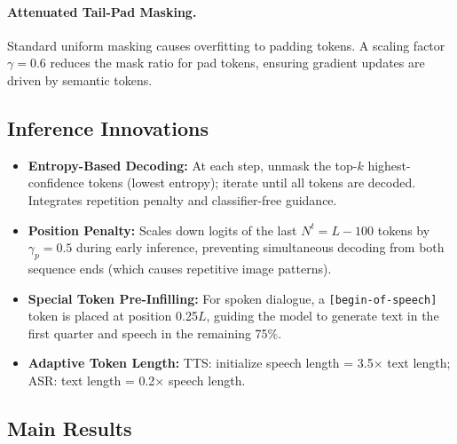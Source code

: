 \documentclass[11pt]{article}
\begin{document}
\paragraph{Attenuated Tail-Pad Masking.} Standard uniform masking causes overfitting to padding tokens. A scaling factor $\gamma{=}0.6$ reduces the mask ratio for pad tokens, ensuring gradient updates are driven by semantic tokens.

\subsection{Inference Innovations}

\begin{itemize}
    \item \textbf{Entropy-Based Decoding:} At each step, unmask the top-$k$ highest-confidence tokens (lowest entropy); iterate until all tokens are decoded. Integrates repetition penalty and classifier-free guidance.
    \item \textbf{Position Penalty:} Scales down logits of the last $N^t = L{-}100$ tokens by $\gamma_p{=}0.5$ during early inference, preventing simultaneous decoding from both sequence ends (which causes repetitive image patterns).
    \item \textbf{Special Token Pre-Infilling:} For spoken dialogue, a \texttt{[begin-of-speech]} token is placed at position 0.25$L$, guiding the model to generate text in the first quarter and speech in the remaining 75\%.
    \item \textbf{Adaptive Token Length:} TTS: initialize speech length = 3.5$\times$ text length; ASR: text length = 0.2$\times$ speech length.
\end{itemize}

\subsection{Main Results}
\end{document}

